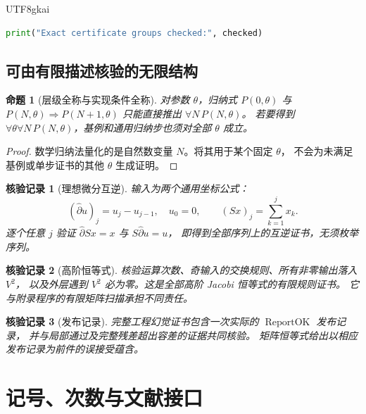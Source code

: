 \documentclass[12pt,a4paper,openany]{report}
\newtheorem{proposition}{命题}[chapter]
\newtheorem{Certificate}{核验记录}[chapter]
\numberwithin{equation}{chapter}
\newcommand{\ReportOK}{\operatorname{ReportOK}}
\begin{document}
\begin{CJK*}{UTF8}{gkai}
\begin{lstlisting}[language=Python]
print("Exact certificate groups checked:", checked)
\end{lstlisting}

\section{可由有限描述核验的无限结构}

\begin{proposition}[层级全称与实现条件全称]
对参数 $\theta$，归纳式
$P(0,\theta)$ 与 $P(N,\theta)\Rightarrow P(N+1,\theta)$
只能直接推出 $\forall N\,P(N,\theta)$。
若要得到 $\forall\theta\forall N\,P(N,\theta)$，基例和通用归纳步也须对全部 $\theta$ 成立。
\end{proposition}
\begin{proof}
数学归纳法量化的是自然数变量 $N$。将其用于某个固定 $\theta$，
不会为未满足基例或单步证书的其他 $\theta$ 生成证明。
\end{proof}

\begin{Certificate}[理想微分互逆]
输入为两个通用坐标公式：
\[
 (\widehat\partial u)_j=u_j-u_{j-1},\quad u_0=0,\qquad
 (Sx)_j=\sum_{k=1}^j x_k.
\]
逐个任意 $j$ 验证 $\widehat\partial Sx=x$ 与 $S\widehat\partial u=u$，
即得到全部序列上的互逆证书，无须枚举序列。
\end{Certificate}

\begin{Certificate}[高阶恒等式]
核验运算次数、奇输入的交换规则、所有非零输出落入 $V^2$，
以及外层遇到 $V^2$ 必为零。这是全部高阶 Jacobi 恒等式的有限规则证书。
它与附录程序的有限矩阵扫描承担不同责任。
\end{Certificate}

\begin{Certificate}[发布记录]
完整工程幻觉证书包含一次实际的 $\ReportOK$ 发布记录，
并与局部通过及完整残差超出容差的证据共同核验。
矩阵恒等式给出以相应发布记录为前件的误接受蕴含。
\end{Certificate}

\chapter{记号、次数与文献接口}
\label{app:notation}


\end{CJK*}
\end{document}
